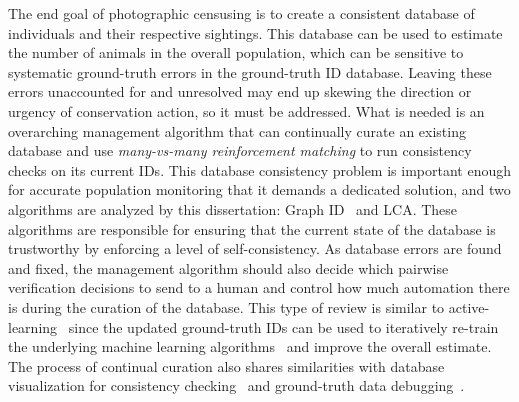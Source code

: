 The end goal of photographic censusing is to create a consistent database of individuals and their respective sightings.  This database can be used to estimate the number of animals in the overall population, which can be sensitive to systematic ground-truth errors in the ground-truth ID database.  Leaving these errors unaccounted for and unresolved may end up skewing the direction or urgency of conservation action, so it must be addressed.  What is needed is an overarching management algorithm that can continually curate an existing database and use \textit{many-vs-many reinforcement matching} to run consistency checks on its current IDs.  This database consistency problem is important enough for accurate population monitoring that it demands a dedicated solution, and two algorithms are analyzed by this dissertation: Graph ID~\cite{crall_identifying_2017} and LCA.  These algorithms are responsible for ensuring that the current state of the database is trustworthy by enforcing a level of self-consistency.  As database errors are found and fixed, the management algorithm should also decide which pairwise verification decisions to send to a human and control how much automation there is during the curation of the database.  This type of review is similar to active-learning~\cite{cohn_improving_1994,cohn_active_1996,settles_active_2009,oh_study_2021} since the updated ground-truth IDs can be used to iteratively re-train the underlying machine learning algorithms~\cite{lindskog_time_2021} and improve the overall estimate.  The process of continual curation also shares similarities with database visualization for consistency checking~\cite{qin_making_2020} and ground-truth data debugging~\cite{rezig_dagger_2020,rezig_data_2019}.

